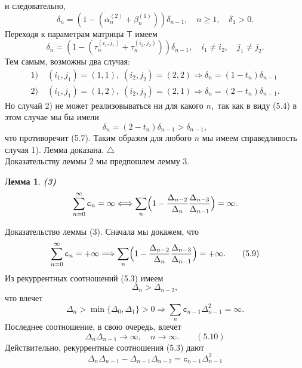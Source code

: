 \documentclass[12 pt, a4 paper]{article}
\theoremstyle{plain}   \newtheorem{Pro}{Задача}
\newtheorem{Lem}{Лемма}
\begin{document}
и следовательно,
\begin{equation*}
  \delta _n =(1-(\alpha _n ^{(2)} +\beta _n ^{(1)}))
    \delta _{n-1}, \quad n \geqslant 1,
	  \quad \delta _1 >0.
\end{equation*}
Переходя к параметрам матрицы
$ \mathsf{T}  $
имеем
\begin{equation*}
  \delta _n =(1-(\tau _n ^{(i_1 ,j_1 )}+
    \tau _n ^{(i_2 ,j_2 )})) \delta _{n-1},
	  \quad i_1 \not = i_2 ,
	    \quad j_1 \not = j_2 .
\end{equation*}
Тем самым, возможны два случая:
\begin{align*}
  1) & \; (i_1 , j_1 )=(1,1), \;
    (i_2 , j_2 )=(2,2) \Longrightarrow
	  \delta _n =(1-t_n )\delta _{n-1} \\
  2) & \; (i_1 , j_1 )=(1,2) , \;
    (i_2 , j_2 )=(2,1) \Longrightarrow
	  \delta _n =(2-t_n )\delta _{n-1}.
\end{align*}
Но случай 2) не может реализовываться ни для какого
$ n , $
так как в виду (5.4) в этом случае мы бы имели
$$
  \delta _n =(2-t_n )\delta _{n-1} > \delta _{n-1},
$$
что противоречит (5.7). Таким образом для любого
$ n $ мы имеем справедливость случая 1). Лемма доказана.
$ \triangle $ \\
Доказательству леммы 2 мы предпошлем лемму 3.
\begin{Lem}
{\bfseries (3)}
\begin{equation*}
  \sum _{n=0}^{\infty}\mathtt{c}_n =\infty
    \Longleftrightarrow \sum _n \Bigl (
	  1- \frac{\Delta _{n-2}}{\Delta _n}
	    \frac{\Delta _{n-3}}{\Delta _{n-1}}
		  \Bigr ) =\infty .
\end{equation*}
\end{Lem}
{\Large Доказательство леммы (3).}
Сначала мы докажем, что
\begin{equation*}
  \sum _{n=0}^{\infty}\mathtt{c}_n =+\infty
    \Longrightarrow \sum _n \Bigl (
	  1-\frac{\Delta _{n-2}}{\Delta _n}
	    \frac{\Delta _{n-3}}{\Delta _{n-1}}
		  \Bigr ) =+\infty .
		    \qquad (5.9)
\end{equation*}
Из рекуррентных соотношений (5.3) имеем
$$
  \Delta _n >\Delta _{n-2} ,
$$
что влечет
$$
  \Delta _n > \min \{ \Delta _0 , \Delta _1 \} >0
    \Longrightarrow \sum _n \mathtt{c}_{n-1}
	  \Delta _{n-1}^2 =\infty .
$$
Последнее соотношение, в свою очередь, влечет
$$
 \Delta _n \Delta _{n-1} \longrightarrow \infty ,
 \quad n \rightarrow \infty . \qquad (5.10)
$$
Действительно, рекуррентные соотношения (5.3) дают
$$
  \Delta _n \Delta _{n-1}-
    \Delta _{n-1} \Delta _{n-2} =
	  \mathtt{c}_{n-1}\Delta _{n-1}^2
$$
\end{document}
